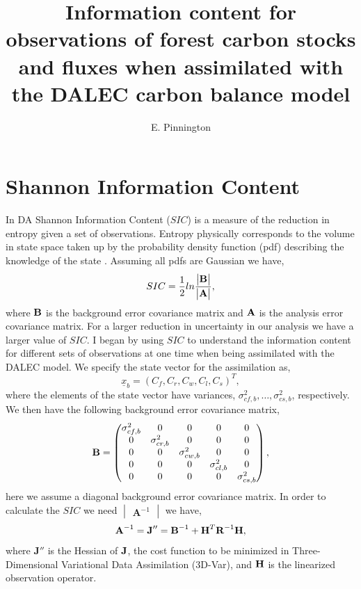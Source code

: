 \documentclass[11pt]{article}
\title{Information content for observations of forest carbon stocks and fluxes when assimilated with the DALEC carbon balance model}
\author{\normalsize{E. Pinnington}}
\begin{document}
\maketitle

\section*{Shannon Information Content}

In DA Shannon Information Content ($SIC$) is a measure of the reduction in entropy given a set of observations. Entropy physically corresponds to the volume in state space taken up by the probability density function (pdf) describing the knowledge of the state \cite{rodgers2000inverse}. Assuming all pdfs are Gaussian we have,
\[
SIC=\frac{1}{2}ln\frac{\begin{vmatrix} \bf{B} \end{vmatrix}}{\begin{vmatrix} \bf{A} \end{vmatrix}},
\]
where $\bf{B}$ is the background error covariance matrix and $\bf{A}$ is the analysis error covariance matrix. For a larger reduction in uncertainty in our analysis we have a larger value of $SIC$. I began by using $SIC$ to understand the information content for different sets of observations at one time when being assimilated with the DALEC model. We specify the state vector for the assimilation as,
\[ \underline{x}_b = (C_f, C_r, C_w, C_l, C_s)^T, \] 
where the elements of the state vector have variances, $\sigma_{cf,b}^{2},\ldots,\sigma_{cs,b}^{2}$, respectively. We then have the following background error covariance matrix,
\[
\bf{B} = \begin{pmatrix} 
\sigma_{cf,b}^{2} & 0 & 0 & 0 & 0 \\
0 & \sigma_{cr,b}^{2} & 0 & 0 & 0 \\
0 & 0 & \sigma_{cw,b}^{2} & 0 & 0 \\
0 & 0 & 0 & \sigma_{cl,b}^{2} & 0 \\
0 & 0 & 0 & 0 & \sigma_{cs,b}^{2} \\
\end{pmatrix},
\]  
here we assume a diagonal background error covariance matrix. In order to calculate the $SIC$ we need $\begin{vmatrix} \textbf{A}^{-1} \end{vmatrix}$ we have,
\[
\textbf{A}^{-1}=\textbf{J}'' = \textbf{B}^{-1}+\textbf{H}^{T}\textbf{R}^{-1}\bf{H}, 
\]
where $\textbf{J}''$ is the Hessian of $\bf{J}$, the cost function to be minimized in Three-Dimensional Variational Data Assimilation (3D-Var), and $\bf{H}$ is the linearized observation operator. 
\end{document}
